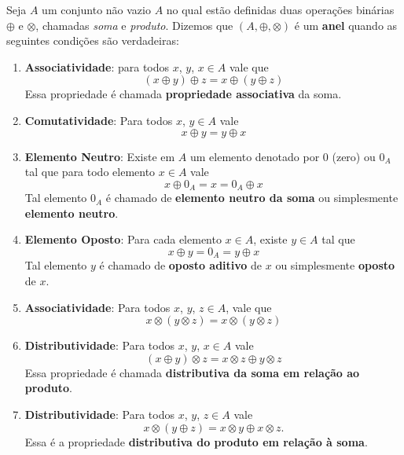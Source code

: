 \begin{definicao}
	Seja $A$ um conjunto n{\~a}o vazio $A$ no qual estão definidas duas opera{\c c}{\~o}es binárias $\oplus$ e $\otimes$, chamadas \textit{soma} e \textit{produto}.  Dizemos que $(A, \oplus, \otimes)$ {\'e} um \textbf{anel} quando as seguintes condi{\c c}{\~o}es s{\~a}o verdadeiras:
	\begin{enumerate}[label={\roman*})]
		\item \textbf{Associatividade}: para todos $x$, $y$, $x\in A$ vale que
		\[
			(x \oplus y) \oplus z = x \oplus (y \oplus z)
		\]
		Essa propriedade {\'e} chamada \textbf{propriedade associativa} da soma.

		\item \textbf{Comutatividade}: Para todos $x$, $y \in A$ vale
		\[
			x \oplus y = y \oplus x
		\]

		\item \textbf{Elemento Neutro}: Existe em $A$ um elemento denotado por $0$ (zero) ou $0_{A}$ tal que para todo elemento $x \in A$ vale
		\[
			x \oplus 0_A = x = 0_A \oplus x
		\]
		Tal elemento $0_A$ é chamado de \textbf{elemento neutro da soma} ou simplesmente \textbf{elemento neutro}.

		\item \textbf{Elemento Oposto}: Para cada elemento $x \in A$, existe $y \in A$ tal que
		\[
			x \oplus y = 0_A = y \oplus x
		\]
		Tal elemento $y$ é chamado de \textbf{oposto aditivo} de $x$ ou simplesmente \textbf{oposto} de $x$.

		\item \textbf{Associatividade}: Para todos $x$, $y$, $z \in A$, vale que
		\[
			x\otimes (y\otimes z) = x\otimes (y\otimes z)
		\]

		\item \textbf{Distributividade}: Para todos $x$, $y$, $x \in A$ vale
		\[
			(x \oplus y)\otimes z = x\otimes z \oplus y\otimes z
		\]
		Essa propriedade {\'e} chamada \textbf{distributiva da soma em rela{\c c}{\~a}o ao produto}.
		
		\item \textbf{Distributividade}: Para todos $x$, $y$, $z \in A$ vale
		\[
			x\otimes(y \oplus z) = x\otimes y \oplus x\otimes z.
		\]
		Essa {\'e} a propriedade \textbf{distributiva do produto em rela{\c c}{\~a}o {\`a} soma}.
	\end{enumerate}
\end{definicao}

